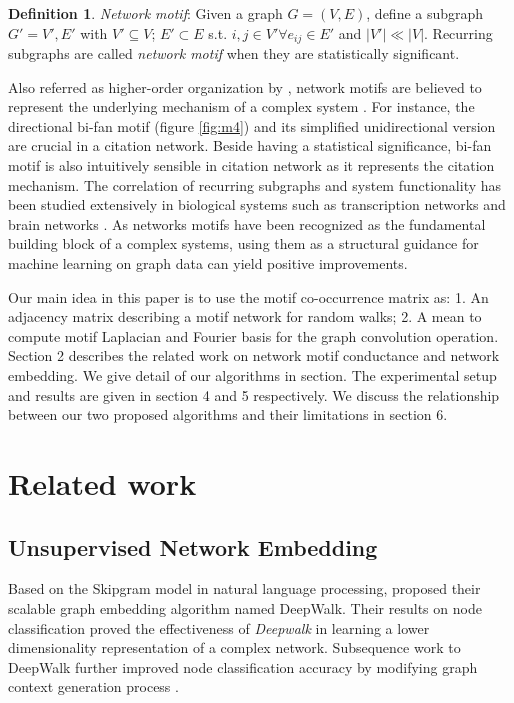 \documentclass{article}
\theoremstyle{definition}
\newtheorem{definition}{Definition}[section]
\begin{document}
\begin{definition}{\emph{Network motif}}:
Given a graph $G = (V,E)$, define a subgraph $G' = {V', E'}$ with $V' 
\subseteq V$;
$E' \subset E$ s.t. $i,j \in V' \forall e_{ij} \in E'$ and $|V'| \ll |V|$. 
Recurring subgraphs are called \emph{network motif} when they are 
statistically significant.
\end{definition}

Also referred as higher-order organization by \citeauthor{juremotif}, 
network motifs are believed to represent the underlying mechanism of a 
complex system 
\cite{netmotif,alon2006introduction,mangan2003structure}. 
For instance, the directional bi-fan motif (figure \ref{fig:m4})
and its simplified unidirectional version are crucial in a citation 
network. Beside having a statistical significance, bi-fan motif is also 
intuitively sensible in citation network as it represents the citation 
mechanism. The correlation of recurring subgraphs and system 
functionality has been studied extensively in biological systems such as 
transcription networks \cite{mangan2003structure} and brain 
networks \cite{brainnetheuvel,honey2007network}. As networks motifs
have been recognized as the fundamental building block of a complex
systems, using them as a structural guidance for machine learning
on graph data can yield positive improvements.

Our main idea in this paper is to use the motif co-occurrence matrix as: 
1. An adjacency matrix describing a motif network for random walks; 2. A 
mean to compute motif Laplacian and Fourier basis for the graph 
convolution operation. Section 2 describes the related work on network
motif conductance and network embedding. We give detail of our algorithms
in section. The experimental setup and results are given in section 4 and 
5 respectively. We discuss the relationship between our two proposed
algorithms and their limitations in section 6.

\section{Related work}

\subsection{Unsupervised Network Embedding}

Based on the Skipgram model \cite{skipgram} in natural language 
processing, \citeauthor{Deepwalk} proposed their scalable graph embedding 
algorithm named DeepWalk. Their results on node classification proved the 
effectiveness of \emph{Deepwalk} in learning a lower dimensionality 
representation of a complex network. Subsequence work to DeepWalk further 
improved node classification accuracy by modifying graph context 
generation process \cite{line,grarep,planetoid,node2vec}. 
\end{document}
